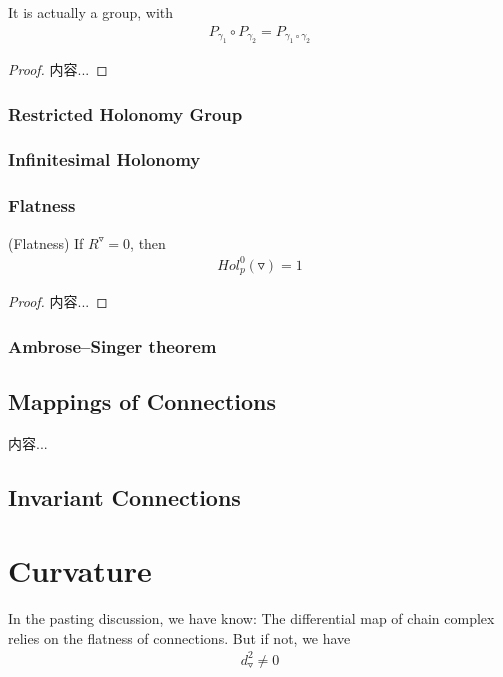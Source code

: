 \documentclass[Total.tex]{subfiles}
\begin{document}
				\begin{proposition}
					It is actually a group, with
					\begin{gather*}
						P_{\gamma_1}\circ P_{\gamma_2}=P_{\gamma_1\circ \gamma_2}
					\end{gather*}
				\end{proposition}
				\begin{proof}
					内容...
				\end{proof}
				
				\subsubsection{Restricted Holonomy Group}
				\subsubsection{Infinitesimal Holonomy}
				\subsubsection{Flatness}
					\begin{corollary}
						(Flatness) If $R^\triangledown=0$, then 
						\begin{gather*}
							Hol^0_p(\triangledown)=1
						\end{gather*}
					\end{corollary}
					\begin{proof}
						内容...
					\end{proof}
					
				\subsubsection{Ambrose–Singer theorem}
			\subsection{Mappings of Connections}
				\begin{Def}
					内容...
				\end{Def}
			\subsection{Invariant Connections}
		\section{Curvature}
		
		In the pasting discussion, we have know: The differential map of chain complex relies on the flatness of connections. But if not, we have
		\begin{gather*}
			d_{\triangledown}^2\not=0
		\end{gather*}
		
\end{document}
